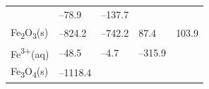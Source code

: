 \documentclass[
  9pt,
]{extbook}
\theoremstyle{definition}
\theoremstyle{definition}
\theoremstyle{definition}
\theoremstyle{remark}
\begin{document}
\begin{longtable}[]{@{}lllll@{}}
\begin{minipage}[t]{0.19\columnwidth}
\end{minipage} & \begin{minipage}[t]{0.20\columnwidth}\raggedright
--78.9\strut
\end{minipage} & \begin{minipage}[t]{0.18\columnwidth}\raggedright
--137.7 \textbar{}\strut
\end{minipage} & \begin{minipage}[t]{0.18\columnwidth}\raggedright
\strut
\end{minipage}\tabularnewline
\begin{minipage}[t]{0.10\columnwidth}\raggedright
Fe\textsubscript{2}O\textsubscript{3}(s)\strut
\end{minipage} & \begin{minipage}[t]{0.19\columnwidth}\raggedright
--824.2\strut
\end{minipage} & \begin{minipage}[t]{0.20\columnwidth}\raggedright
--742.2\strut
\end{minipage} & \begin{minipage}[t]{0.18\columnwidth}\raggedright
87.4\strut
\end{minipage} & \begin{minipage}[t]{0.18\columnwidth}\raggedright
103.9\strut
\end{minipage}\tabularnewline
\begin{minipage}[t]{0.10\columnwidth}\raggedright
Fe\textsuperscript{3+}(aq)\strut
\end{minipage} & \begin{minipage}[t]{0.19\columnwidth}\raggedright
--48.5\strut
\end{minipage} & \begin{minipage}[t]{0.20\columnwidth}\raggedright
--4.7\strut
\end{minipage} & \begin{minipage}[t]{0.18\columnwidth}\raggedright
--315.9 \textbar{}\strut
\end{minipage} & \begin{minipage}[t]{0.18\columnwidth}\raggedright
\strut
\end{minipage}\tabularnewline
\begin{minipage}[t]{0.10\columnwidth}\raggedright
Fe\textsubscript{3}O\textsubscript{4}(s)\strut
\end{minipage} & \begin{minipage}[t]{0.19\columnwidth}\raggedright
--1118.4\strut
\end{minipage} & \begin{minipage}[t]{0.20\columnwidth}\raggedright

\end{minipage}
\end{longtable}
\end{document}
